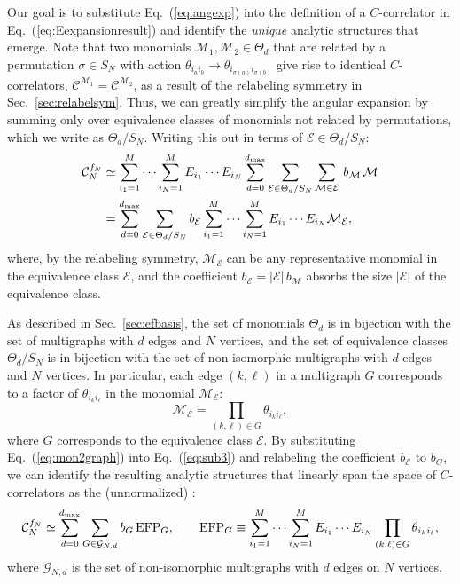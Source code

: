 \documentclass[letterpaper,11pt]{article}
\DeclareRobustCommand{\Sec}[1]{Sec.~\ref{#1}}
\DeclareRobustCommand{\Eq}[1]{Eq.~(\ref{#1})}
\newcommand{\B}{\text{EFP}\xspace}
\newcommand{\Bs}{\text{EFPs}\xspace}
\begin{document}
Our goal is to substitute \Eq{eq:angexp} into the definition of a $C$-correlator in \Eq{eq:Eexpansionresult} and identify the \emph{unique} analytic structures that emerge.
%
Note that two monomials $\mathcal M_1,\mathcal M_2\in \Theta_d$ that are related by a permutation $\sigma\in S_N$ with action $\theta_{i_ai_b}\to\theta_{i_{\sigma(a)} i_{\sigma(b)}}$ give rise to identical $C$-correlators, $\mathcal C^{\mathcal M_1}=\mathcal C^{\mathcal M_2}$, as a result of the relabeling symmetry in \Sec{sec:relabelsym}.
%
Thus, we can greatly simplify the angular expansion by summing only over equivalence classes of monomials not related by permutations, which we write as $\Theta_d/S_N$.
%
Writing this out in terms of $\mathcal{E} \in\Theta_d/S_N$:
\begin{align}
\mathcal C_N^{f_N} & \simeq \sum_{i_1 = 1}^M \cdots \sum_{i_N = 1}^M E_{i_1}\cdots E_{i_N} \sum_{d=0}^{d_{\rm max}} \sum_{\mathcal E\in\Theta_d/S_N}\sum_{\mathcal M\in\mathcal E} \, b_{\mathcal M} \, \mathcal M\label{eq:sub2}\\
&=\sum_{d=0}^{d_{\rm max}}\sum_{\mathcal E\in\Theta_d/S_N}b_{\mathcal E}\sum_{i_1 = 1}^M \cdots \sum_{i_N = 1}^M E_{i_1}\cdots E_{i_N}\mathcal M_{\mathcal E}\label{eq:sub3},
\end{align}
where, by the relabeling symmetry, $\mathcal M_{\mathcal E}$ can be any representative monomial in the equivalence class $\mathcal{E}$, and the coefficient $b_{\mathcal E} = |\mathcal E | \, b_{\mathcal M}$ absorbs the size $|\mathcal E |$ of the equivalence class.

As described in \Sec{sec:efbasis}, the set of monomials $\Theta_d$ is in bijection with the set of multigraphs with $d$ edges and $N$ vertices, and the set of equivalence classes $\Theta_d/S_N$ is in bijection with the set of non-isomorphic multigraphs with $d$ edges and $N$ vertices. 
%
In particular, each edge $(k,\ell)$ in a multigraph $G$ corresponds to a factor of $\theta_{i_ki_\ell}$ in the monomial $\mathcal M_{\mathcal E}$:
\begin{equation}\label{eq:mon2graph}
\mathcal M_{\mathcal E}=\prod_{(k,\ell)\in G}\theta_{i_ki_\ell},
\end{equation}
where $G$ corresponds to the equivalence class $\mathcal E$. 
%
By substituting \Eq{eq:mon2graph} into \Eq{eq:sub3} and relabeling the coefficient $b_{\mathcal E}$ to $b_G$, we can identify the resulting analytic structures that linearly span the space of $C$-correlators as the (unnormalized) \Bs:
\begin{equation}\label{eq:efpspanCN}
\mathcal C_N^{f_N}\simeq \sum_{d=0}^{d_{\rm max}}\sum_{G\in\mathcal G_{N,d}}b_G\,\B_G,\qquad \B_G\equiv\sum_{i_1=1}^M\cdots\sum_{i_N=1}^ME_{i_1}\cdots E_{i_N}\prod_{(k,\ell)\in G}\theta_{i_ki_\ell},
\end{equation}
where $\mathcal G_{N,d}$ is the set of non-isomorphic multigraphs with $d$ edges on $N$ vertices.
\end{document}
